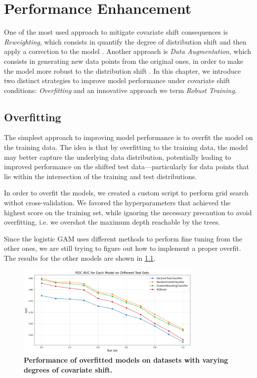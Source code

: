 \chapter{Performance Enhancement}

One of the most used approach to mitigate covariate shift consequences is \textit{Reweighting}, which consists in quantify the degree of distribution shift and then apply a correction to the model \cite{zhang}. Another approach is \textit{Data Augmentation}, which consists in generating new data points from the original ones, in order to make the model more robust to the distribution shift \cite{zhao}. In this chapter, we introduce two distinct strategies to improve model performance under covariate shift conditions: \textit{Overfitting} and an innovative approach we term \textit{Robust Training}.

\section{Overfitting}

The simplest approach to improving model performance is to overfit the model on the training data. The idea is that by overfitting to the training data, the model may better capture the underlying data distribution, potentially leading to improved performance on the shifted test data—particularly for data points that lie within the intersection of the training and test distributions.

In order to overfit the models, we created a custom script to perform grid search withot cross-validation. We favored the hyperparameters that achieved the highest score on the training set, while ignoring the necessary precaution to avoid overfitting, i.e. we overshot the maximum depth reachable by the trees.

Since the logistic GAM uses different methods to perform fine tuning from the other ones, we are still trying to figure out how to implement a proper overfit. The results for the other models are shown in \cref{fig:overfitted-models-perf}.

\begin{figure}[H]
    \centering
    \includegraphics[width=0.8\textwidth]{assets/overfit_no_gam.png} 
    \caption{\textbf{Performance of overfitted models on datasets with varying degrees of covariate shift.}}
    \label{fig:overfitted-models-perf}
\end{figure}


